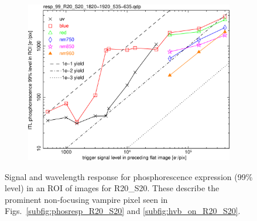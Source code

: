 \begin{figure}[!htbp]
\centering
\begin{subfigure}{0.45\textwidth}    
  \centering
  \includegraphics[width=\textwidth]{figures/phosphorescence-survey/phos_resp/resp_99_R20_S20_1820-1920_535-635.png}    
\end{subfigure}
\newline
\caption{Signal and wavelength response for phosphorescence expression (99\% level) in an ROI of images for R20\_S20. These describe the prominent non-focusing vampire pixel seen in Figs.~\ref{subfig:phosresp_R20_S20} and \ref{subfig:hvb_on_R20_S20}.}
\label{fig:phos:resp:R20S20}
\end{figure}

